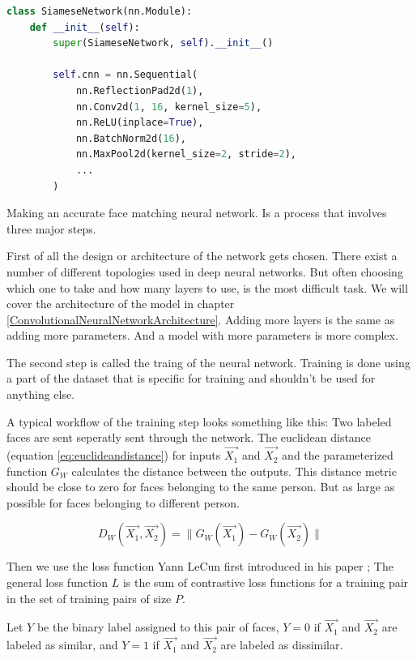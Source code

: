 \begin{lstlisting}[language=Python, caption={Pytorch neural network example}, label={lst:pytorch_example}, frame=single]
class SiameseNetwork(nn.Module):
    def __init__(self):
        super(SiameseNetwork, self).__init__()

        self.cnn = nn.Sequential(
            nn.ReflectionPad2d(1),
            nn.Conv2d(1, 16, kernel_size=5),
            nn.ReLU(inplace=True),
            nn.BatchNorm2d(16),
            nn.MaxPool2d(kernel_size=2, stride=2),
            ...
        )
\end{lstlisting}

Making an accurate face matching neural network. Is a process that involves three major steps.

First of all the design or architecture of the network gets chosen. There exist a number of different topologies used in deep neural networks. But often choosing which one to take and how many layers to use, is the most difficult task. We will cover the architecture of the model in chapter \ref{ConvolutionalNeuralNetworkArchitecture}. Adding more layers is the same as adding more parameters. And a model with more parameters is more complex.

The second step is called the traing of the neural network. Training is done using a part of the dataset that is specific for training and shouldn't be used for anything else.

A typical workflow of the training step looks something like this: Two labeled faces are sent seperatly sent through the network. The euclidean distance (equation \ref{eq:euclideandistance}) for inputs $\vec{X_{1}}$ and $\vec{X_{2}}$ and the parameterized function $G_{W}$ calculates the distance between the outputs. This distance metric should be close to zero for faces belonging to the same person. But as large as possible for faces belonging to different person.

\begin{equation} \label{eq:euclideandistance}
  D_{W}(\vec{X_{1}},\vec{X_{2}})=\lVert G_{W}(\vec{X_{1}}) - G_{W}(\vec{X_{2}}) \rVert
\end{equation}

Then we use the loss function Yann LeCun first introduced in his paper \cite{hadsell2006dimensionality}; The general loss function $L$ is the sum of contrastive loss functions for a training pair in the set of training pairs of size $P$.

Let $Y$ be the binary label assigned to this pair of faces, $Y=0$ if $\vec{X_{1}}$ and $\vec{X_{2}}$ are labeled as similar, and $Y=1$ if $\vec{X_{1}}$ and $\vec{X_{2}}$ are labeled as dissimilar.

